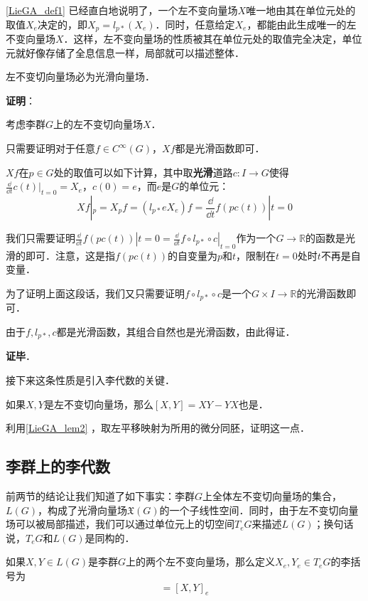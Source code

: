 \autoref{LieGA_def1} 已经直白地说明了，一个左不变向量场$X$唯一地由其在单位元处的取值$X_e$决定的，即$X_p=l_{p*}(X_e)$．同时，任意给定$X_e$，都能由此生成唯一的左不变向量场$X$．这样，左不变向量场的性质被其在单位元处的取值完全决定，单位元就好像存储了全息信息一样，局部就可以描述整体．

\begin{theorem}{}
左不变切向量场必为光滑向量场．
\end{theorem}

\textbf{证明}：

考虑李群$G$上的左不变切向量场$X$．

只需要证明对于任意$f\in C^{\infty}(G)$，$Xf$都是光滑函数即可．

$Xf$在$p\in G$处的取值可以如下计算，其中取\textbf{光滑}道路$c:I\to G$使得$\frac{\dd}{\dd t}c(t)|_{t=0}=X_e$，$c(0)=e$，而$e$是$G$的单位元：
\begin{equation}
Xf|_p=X_pf=(l_{p*}eX_e)f=\frac{\dd}{\dd t}f(pc(t))|{t=0}
\end{equation}

我们只需要证明$\frac{\dd}{\dd t}f(pc(t))|{t=0}=\frac{\dd}{\dd t}f\circ l_{p*}\circ c|_{t=0}$作为一个$G\to \mathbb{R}$的函数是光滑的即可．注意，这是指$f(pc(t))$的自变量为$p$和$t$，限制在$t=0$处时$t$不再是自变量．

为了证明上面这段话，我们又只需要证明$f\circ l_{p*}\circ c$是一个$G\times I\to \mathbb{R}$的光滑函数即可．

由于$f, l_{p*}, c$都是光滑函数，其组合自然也是光滑函数，由此得证．

\textbf{证毕}．

接下来这条性质是引入李代数的关键．

\begin{exercise}{}
如果$X, Y$是左不变切向量场，那么$[X, Y]=XY-YX$也是．

利用\autoref{LieGA_lem2} ，取左平移映射为所用的微分同胚，证明这一点．
\end{exercise}


\subsection{李群上的李代数}

前两节的结论让我们知道了如下事实：李群$G$上全体左不变切向量场的集合，$L(G)$，构成了光滑向量场$\mathfrak{X}(G)$的一个子线性空间．同时，由于左不变切向量场可以被局部描述，我们可以通过单位元上的切空间$T_eG$来描述$L(G)$；换句话说，$T_eG$和$L(G)$是同构的．

\begin{definition}{}
如果$X, Y\in L(G)$是李群$G$上的两个左不变向量场，那么定义$X_e, Y_e\in T_eG$的李括号为
\begin{equation}
[X_e, Y_e]=[X, Y]_e
\end{equation}
\end{definition}















